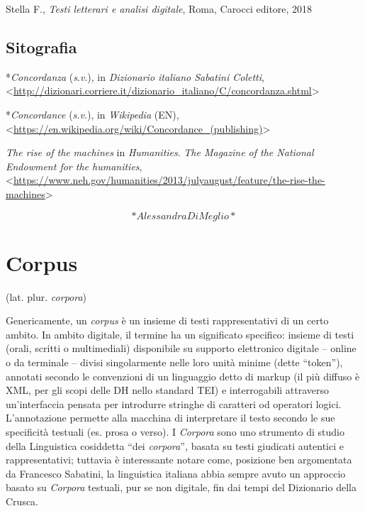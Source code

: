 \documentclass[
  b5paper,
  twoside,
  11pt,
  chapterprefix=false,
  bibliography=totocnumbered,
  listof=flat]{scrbook}
\begin{document}
Stella F., \emph{Testi letterari e analisi digitale}, Roma, Carocci editore,
2018

\hypertarget{sitografia-4}{%
\section*{Sitografia}\label{sitografia-4}}

*\emph{Concordanza} (\emph{s}.\emph{v}.), in \emph{Dizionario italiano Sabatini Coletti},
\textless{}{\url{http://dizionari.corriere.it/dizionario_italiano/C/concordanza.shtml}\textgreater{}}

*\emph{Concordance} (\emph{s.v}.), in \emph{Wikipedia} (EN),
\textless{}{\url{https://en.wikipedia.org/wiki/Concordance_(publishing)}\textgreater{}}

\emph{The rise of the} \emph{machines} in \emph{Humanities}. \emph{The Magazine of the
National Endowment for the humanities},
\textless{}{\url{https://www.neh.gov/humanities/2013/julyaugust/feature/the-rise-the-machines}\textgreater{}}

\[*Alessandra Di Meglio*\]

\hypertarget{corpus}{%
\chapter{Corpus}\label{corpus}}

(lat. plur. \emph{corpora})

Genericamente, un \emph{corpus} è un insieme di testi rappresentativi di un
certo ambito. In ambito digitale, il termine ha un significato
specifico: insieme di testi (orali, scritti o multimediali) disponibile
su supporto elettronico digitale -- online o da terminale -- divisi
singolarmente nelle loro unità minime (dette \enquote{token}), annotati secondo
le convenzioni di un linguaggio detto di markup (il più diffuso è XML,
per gli scopi delle DH nello standard TEI) e interrogabili attraverso
un'interfaccia pensata per introdurre stringhe di caratteri od operatori
logici. L'annotazione permette alla macchina di interpretare il testo
secondo le sue specificità testuali (es. prosa o verso). I \emph{Corpora}
sono uno strumento di studio della Linguistica cosiddetta \enquote{dei
\emph{corpora}}\emph{,} basata su testi giudicati autentici e rappresentativi;
tuttavia è interessante notare come, posizione ben argomentata da
Francesco Sabatini, la linguistica italiana abbia sempre avuto un
approccio basato su \emph{Corpora} testuali, pur se non digitale, fin dai
tempi del Dizionario della Crusca.
\end{document}
